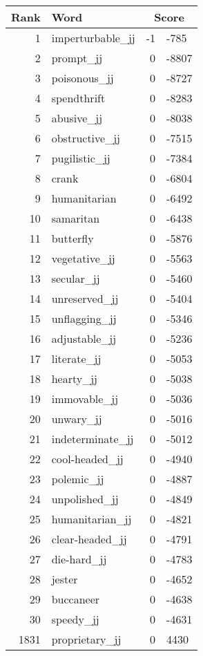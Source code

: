 \begin{longtable}[!htbp]{| rlr@{.}l |}
    \hline
    \textbf{Rank} & \textbf{Word} & \multicolumn{2}{c|}{\textbf{Score}} \\
    \hline
    \endhead
    1 & imperturbable\_jj & -1 & -785 \\
    2 & prompt\_jj & 0 & -8807 \\
    3 & poisonous\_jj & 0 & -8727 \\
    4 & spendthrift & 0 & -8283 \\
    5 & abusive\_jj & 0 & -8038 \\
    6 & obstructive\_jj & 0 & -7515 \\
    7 & pugilistic\_jj & 0 & -7384 \\
    8 & crank & 0 & -6804 \\
    9 & humanitarian & 0 & -6492 \\
    10 & samaritan & 0 & -6438 \\
    11 & butterfly & 0 & -5876 \\
    12 & vegetative\_jj & 0 & -5563 \\
    13 & secular\_jj & 0 & -5460 \\
    14 & unreserved\_jj & 0 & -5404 \\
    15 & unflagging\_jj & 0 & -5346 \\
    16 & adjustable\_jj & 0 & -5236 \\
    17 & literate\_jj & 0 & -5053 \\
    18 & hearty\_jj & 0 & -5038 \\
    19 & immovable\_jj & 0 & -5036 \\
    20 & unwary\_jj & 0 & -5016 \\
    21 & indeterminate\_jj & 0 & -5012 \\
    22 & cool-headed\_jj & 0 & -4940 \\
    23 & polemic\_jj & 0 & -4887 \\
    24 & unpolished\_jj & 0 & -4849 \\
    25 & humanitarian\_jj & 0 & -4821 \\
    26 & clear-headed\_jj & 0 & -4791 \\
    27 & die-hard\_jj & 0 & -4783 \\
    28 & jester & 0 & -4652 \\
    29 & buccaneer & 0 & -4638 \\
    30 & speedy\_jj & 0 & -4631 \\
    1831 & proprietary\_jj & 0 & 4430 \\

\end{longtable}
